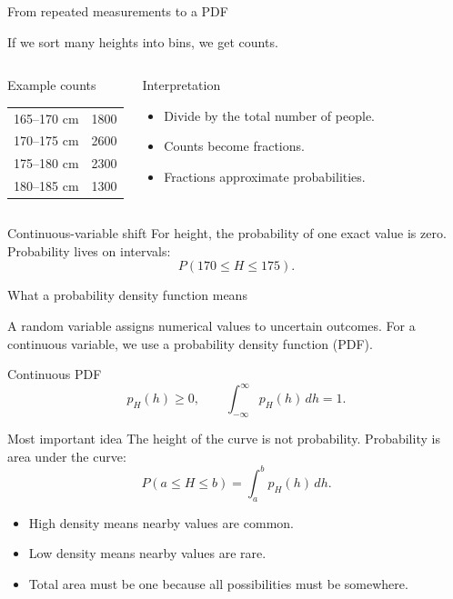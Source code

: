 \documentclass[aspectratio=169]{beamer}
\begin{document}
\begin{frame}{From repeated measurements to a PDF}
\small

If we sort many heights into bins, we get counts.

\begin{columns}[T]
\begin{block}{Example counts}
\begin{tabular}{ll}
165--170 cm & 1800 \\
170--175 cm & 2600 \\
175--180 cm & 2300 \\
180--185 cm & 1300
\end{tabular}
\end{block}

\begin{block}{Interpretation}
\begin{itemize}
    \item[--] Divide by the total number of people.
    \item[--] Counts become fractions.
    \item[--] Fractions approximate probabilities.
\end{itemize}
\end{block}
\end{columns}

\begin{alertblock}{Continuous-variable shift}
For height, the probability of one exact value is zero. Probability lives on intervals:
\[
P(170 \leq H \leq 175).
\]
\end{alertblock}
\end{frame}

\begin{frame}{What a probability density function means}
\small

A random variable assigns numerical values to uncertain outcomes. For a continuous variable, we use a probability density function (PDF).

\begin{block}{Continuous PDF}
\[
p_H(h) \geq 0,
\qquad
\int_{-\infty}^{\infty} p_H(h)\,dh = 1.
\]
\end{block}

\begin{alertblock}{Most important idea}
The height of the curve is \alert{not} probability. Probability is \alert{area under the curve}:
\[
P(a\leq H\leq b)=\int_a^b p_H(h)\,dh.
\]
\end{alertblock}

\begin{itemize}
    \item[--] High density means nearby values are common.
    \item[--] Low density means nearby values are rare.
    \item[--] Total area must be one because all possibilities must be somewhere.
\end{itemize}
\end{frame}
\end{document}
